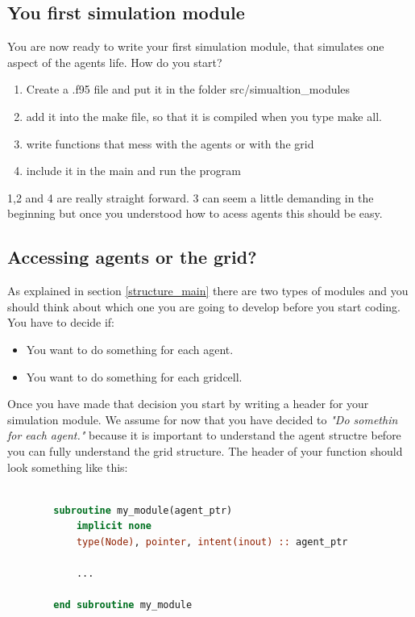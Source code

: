 \documentclass[11pt,a4paper]{article}
\begin{document}
\subsection{You first simulation module}

You are now ready to write your first simulation module, that simulates one aspect of the agents life. How do you start? 

\begin{enumerate}
    \item Create a .f95 file and put it in the folder src/simualtion\_modules
    \item add it into the make file, so that it is compiled when you type make all. 
    \item write functions that mess with the agents or with the grid
    \item include it in the main and run the program
\end{enumerate}

1,2 and 4 are really straight forward. 3 can seem a little demanding in the beginning but once you understood how to acess agents this should be easy. 

\subsection{Accessing agents or the grid?}

As explained in section \ref{structure_main} there are two types of modules and you should think about which one you are going to develop before you start coding. You have to decide if: 

\begin{itemize}
    \item You want to do something for each agent.
    \item You want to do something for each gridcell.
\end{itemize}

Once you have made that decision you start by writing a header for your simulation module. We assume for now that you have decided to \textit{"Do somethin for each agent."} because it is important to understand the agent structre before you can fully understand the grid structure. The header of your function should look something like this: 

    \begin{lstlisting}[language=fortran]

        subroutine my_module(agent_ptr)
            implicit none
            type(Node), pointer, intent(inout) :: agent_ptr

            ...

        end subroutine my_module

    \end{lstlisting}
\end{document}
